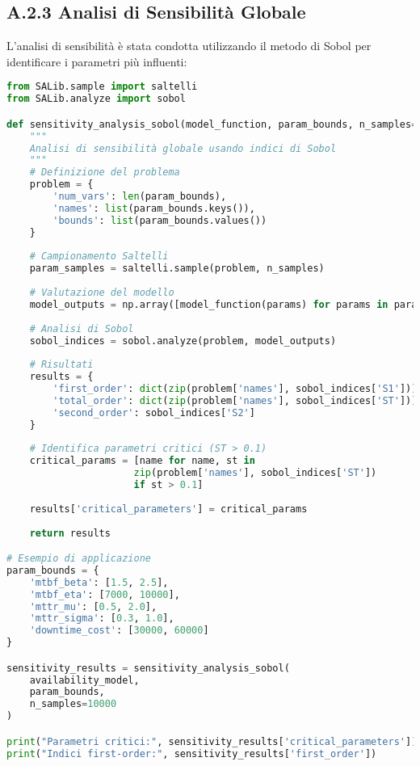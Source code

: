 \subsection{A.2.3 Analisi di Sensibilità Globale}

L'analisi di sensibilità è stata condotta utilizzando il metodo di Sobol per identificare i parametri più influenti:

\begin{lstlisting}[language=Python, caption=Analisi di Sensibilità con Indici di Sobol]
from SALib.sample import saltelli
from SALib.analyze import sobol

def sensitivity_analysis_sobol(model_function, param_bounds, n_samples=10000):
    """
    Analisi di sensibilità globale usando indici di Sobol
    """
    # Definizione del problema
    problem = {
        'num_vars': len(param_bounds),
        'names': list(param_bounds.keys()),
        'bounds': list(param_bounds.values())
    }
    
    # Campionamento Saltelli
    param_samples = saltelli.sample(problem, n_samples)
    
    # Valutazione del modello
    model_outputs = np.array([model_function(params) for params in param_samples])
    
    # Analisi di Sobol
    sobol_indices = sobol.analyze(problem, model_outputs)
    
    # Risultati
    results = {
        'first_order': dict(zip(problem['names'], sobol_indices['S1'])),
        'total_order': dict(zip(problem['names'], sobol_indices['ST'])),
        'second_order': sobol_indices['S2']
    }
    
    # Identifica parametri critici (ST > 0.1)
    critical_params = [name for name, st in 
                      zip(problem['names'], sobol_indices['ST']) 
                      if st > 0.1]
    
    results['critical_parameters'] = critical_params
    
    return results

# Esempio di applicazione
param_bounds = {
    'mtbf_beta': [1.5, 2.5],
    'mtbf_eta': [7000, 10000],
    'mttr_mu': [0.5, 2.0],
    'mttr_sigma': [0.3, 1.0],
    'downtime_cost': [30000, 60000]
}

sensitivity_results = sensitivity_analysis_sobol(
    availability_model, 
    param_bounds,
    n_samples=10000
)

print("Parametri critici:", sensitivity_results['critical_parameters'])
print("Indici first-order:", sensitivity_results['first_order'])
\end{lstlisting}

